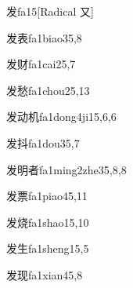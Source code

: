 
\begin{verbete}{发}{fa1}{5}[Radical ⼜]
\end{verbete}

\begin{verbete}{发表}{fa1biao3}{5,8}
\end{verbete}

\begin{verbete}{发财}{fa1cai2}{5,7}
\end{verbete}

\begin{verbete}{发愁}{fa1chou2}{5,13}
\end{verbete}

\begin{verbete}{发动机}{fa1dong4ji1}{5,6,6}
\end{verbete}

\begin{verbete}{发抖}{fa1dou3}{5,7}
\end{verbete}

\begin{verbete}{发明者}{fa1ming2zhe3}{5,8,8}
\end{verbete}

\begin{verbete}{发票}{fa1piao4}{5,11}
\end{verbete}

\begin{verbete}{发烧}{fa1shao1}{5,10}
\end{verbete}

\begin{verbete}{发生}{fa1sheng1}{5,5}
\end{verbete}

\begin{verbete}{发现}{fa1xian4}{5,8}
\end{verbete}

